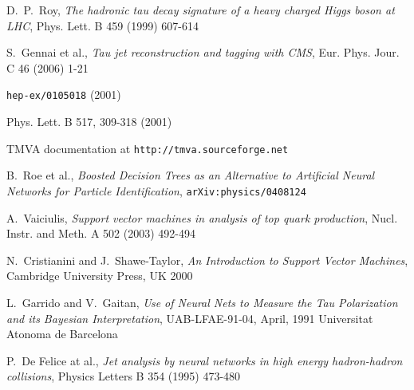 \documentclass[a4paper]{jpconf}
\begin{document}
\begin{thebibliography}{9}
 D.~P.~Roy, \emph{The hadronic tau decay signature of a heavy charged Higgs
              boson at {LHC}}, Phys. Lett. B 459 (1999) 607-614

 S.~Gennai et al., \emph{Tau jet reconstruction
  and tagging with {CMS}}, Eur. Phys. Jour. C 46 (2006) 1-21

 {\tt hep-ex/0105018} (2001) %

 Phys. Lett. B 517, 309-318 (2001) %

 TMVA documentation at {\tt http://tmva.sourceforge.net}

 B.~Roe et al., \emph{Boosted Decision Trees as an 
Alternative to Artificial Neural Networks for Particle Identification},
{\tt arXiv:physics/0408124}

 A.~Vaiciulis, \emph{Support vector machines in analysis of top quark production},
Nucl. Instr. and Meth. A 502 (2003) 492-494

N.~Cristianini and J.~Shawe-Taylor, \emph{An Introduction to Support Vector Machines},
Cambridge University Press, UK 2000

 L.~Garrido and V.~Gaitan, 
\emph{Use of Neural Nets to Measure the Tau Polarization and its Bayesian Interpretation},
UAB-LFAE-91-04, April, 1991 Universitat Atonoma de Barcelona


 P.~De Felice at al., 
\emph{Jet analysis by neural networks in high energy hadron-hadron collisions},
Physics Letters B 354 (1995) 473-480



\end{thebibliography}
\end{document}
